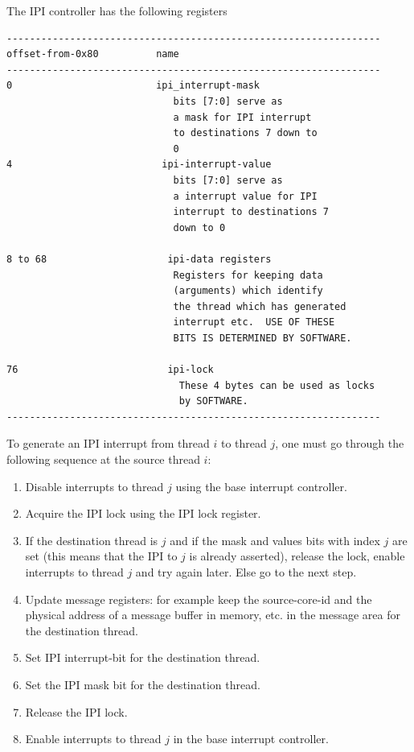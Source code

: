 \documentclass{article}[12pt]
\begin{document}
The IPI controller has the following registers
\begin{verbatim}
-----------------------------------------------------------------
offset-from-0x80          name  
-----------------------------------------------------------------
0                         ipi_interrupt-mask
                             bits [7:0] serve as 
                             a mask for IPI interrupt 
                             to destinations 7 down to 
                             0
4                          ipi-interrupt-value
                             bits [7:0] serve as 
                             a interrupt value for IPI 
                             interrupt to destinations 7 
                             down to 0

8 to 68                     ipi-data registers
                             Registers for keeping data
                             (arguments) which identify
                             the thread which has generated
                             interrupt etc.  USE OF THESE
                             BITS IS DETERMINED BY SOFTWARE.

76                          ipi-lock
                              These 4 bytes can be used as locks
                              by SOFTWARE.
-----------------------------------------------------------------
\end{verbatim}

To generate an IPI interrupt from thread $i$ to thread $j$, 
one must go through the following sequence at the source thread $i$:
\begin{enumerate}
\item Disable interrupts to thread $j$ using the base interrupt controller.
\item Acquire the IPI lock using the IPI lock register.
\item If the destination thread is $j$ and if the mask and values
bits with index $j$ are set (this means that the IPI to $j$ is already asserted), 
release the lock, enable interrupts to
thread $j$ and try again later.  Else
go to the next step.
\item Update message registers: for example keep the 
            source-core-id and the 
            physical address of a message buffer in memory, etc.
            in the message area for the destination thread.  
\item Set IPI interrupt-bit for the destination thread.
\item Set the IPI mask bit for the destination thread.
\item Release the IPI lock.
\item Enable interrupts to thread $j$ in the base interrupt controller.
\end{enumerate}
\end{document}
